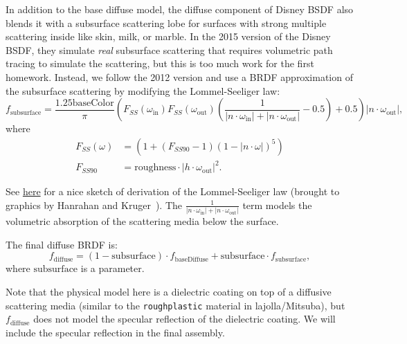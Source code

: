 In addition to the base diffuse model, the diffuse component of Disney BSDF also blends it with a subsurface scattering lobe for surfaces with strong multiple scattering inside like skin, milk, or marble. In the 2015 version of the Disney BSDF, they simulate \emph{real} subsurface scattering that requires volumetric path tracing to simulate the scattering, but this is too much work for the first homework. Instead, we follow the 2012 version and use a BRDF approximation of the subsurface scattering by modifying the Lommel-Seeliger law:
\begin{equation}
	f_{\text{subsurface}} = \frac{1.25 \text{baseColor}}{\pi} \left(
	F_{SS}(\omega_{\text{in}}) F_{SS}(\omega_{\text{out}}) \left(\frac{1}{|n \cdot \omega_{\text{in}}| + |n \cdot \omega_{\text{out}}|} - 0.5 \right) + 0.5 \right) |n \cdot \omega_{\text{out}}|,
\end{equation} 
where
\begin{equation}
\begin{aligned}
F_{SS}(\omega) &= \left(1 + (F_{SS90} - 1) (1 - |n \cdot \omega|)^5 \right) \\
F_{SS90} &= \text{roughness} \cdot |h \cdot \omega_{\text{out}}|^2.
\end{aligned}
\end{equation}

See \href{https://phys.libretexts.org/Bookshelves/Astronomy__Cosmology/Book%3A_Planetary_Photometry_(Tatum_and_Fairbairn)/03%3A_A_Brief_History_of_the_Lommel-Seeliger_Law/3.01%3A_A_Brief_History_of_the_Lommel-Seeliger_Law#:~:text=Description.,physical%20model%20of%20diffuse%20reflection.&text=Thus%2C%20of%20this%20diffuse%20scattered,emerging%20as%20diffuse%20reflected%20radiation.}{here} for a nice sketch of derivation of the Lommel-Seeliger law (brought to graphics by Hanrahan and Kruger~\cite{Hanrahan:1993:RLS}). The $\frac{1}{|n \cdot \omega_{\text{in}}| + |n \cdot \omega_{\text{out}}|}$ term models the volumetric absorption of the scattering media below the surface.

The final diffuse BRDF is:
\begin{equation}
	f_{\text{diffuse}} = (1 - \text{subsurface}) \cdot f_{\text{baseDiffuse}} + \text{subsurface} \cdot f_{\text{subsurface}},
	\label{eq:f_diffuse}
\end{equation}
where $\text{subsurface}$ is a parameter.

Note that the physical model here is a dielectric coating on top of a diffusive scattering media (similar to the \lstinline{roughplastic} material in lajolla/Mitsuba), but $f_{\text{diffuse}}$ does not model the specular reflection of the dielectric coating. We will include the specular reflection in the final assembly.


